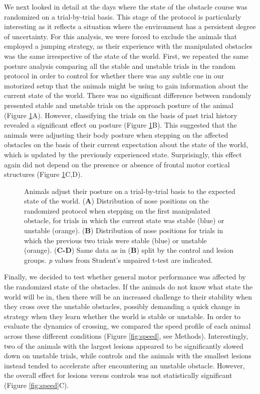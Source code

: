We next looked in detail at the days where the state of the obstacle course was randomized on a trial-by-trial basis. This stage of the protocol is particularly interesting as it reflects a situation where the environment has a persistent degree of uncertainty. For this analysis, we were forced to exclude the animals that employed a jumping strategy, as their experience with the manipulated obstacles was the same irrespective of the state of the world. First, we repeated the same posture analysis comparing all the stable and unstable trials in the random protocol in order to control for whether there was any subtle cue in our motorized setup that the animals might be using to gain information about the current state of the world. There was no significant difference between randomly presented stable and unstable trials on the approach posture of the animal (Figure \ref{fig:random}A). However, classifying the trials on the basis of past trial history revealed a significant effect on posture (Figure \ref{fig:random}B). This suggested that the animals were adjusting their body posture when stepping on the affected obstacles on the basis of their current expectation about the state of the world, which is updated by the previously experienced state. Surprisingly, this effect again did not depend on the presence or absence of frontal motor cortical structures (Figure \ref{fig:random}C,D).

\begin{figure}
\centering

\caption{Animals adjust their posture on a trial-by-trial basis to the expected state of the world. (\textbf{A}) Distribution of nose positions on the randomized protocol when stepping on the first manipulated obstacle, for trials in which the current state was stable (blue) or unstable (orange). (\textbf{B}) Distribution of nose positions for trials in which the previous two trials were stable (blue) or unstable (orange). (\textbf{C-D}) Same data as in (\textbf{B}) split by the control and lesion groups. \emph{p} values from Student's unpaired t-test are indicated.}
\label{fig:random}
\end{figure}

Finally, we decided to test whether general motor performance was affected by the randomized state of the obstacles. If the animals do not know what state the world will be in, then there will be an increased challenge to their stability when they cross over the unstable obstacles, possibly demanding a quick change in strategy when they learn whether the world is stable or unstable. In order to evaluate the dynamics of crossing, we compared the speed profile of each animal across these different conditions (Figure \ref{fig:speed}, see Methods). Interestingly, two of the animals with the largest lesions appeared to be significantly slowed down on unstable trials, while controls and the animals with the smallest lesions instead tended to accelerate after encountering an unstable obstacle. However, the overall effect for lesions versus controls was not statistically significant (Figure \ref{fig:speed}C).

